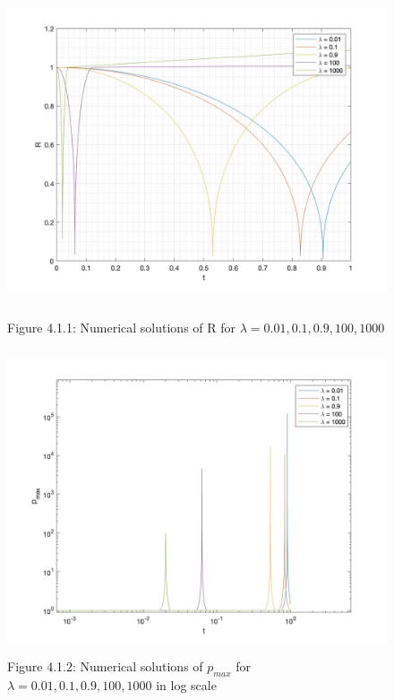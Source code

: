 \documentclass[11pt]{article}
\begin{document}
\begin{figure}[H]
\includegraphics[width = 12cm, height = 9cm]{Q4(1).jpg}
\caption{Figure 4.1.1: Numerical solutions of R for $\lambda = 0.01, 0.1, 0.9, 100, 1000$}
\includegraphics[width = 12cm, height = 9cm]{Q4(2).jpg}
\caption{Figure 4.1.2: Numerical solutions of $p_{max}$ for $\lambda = 0.01, 0.1, 0.9, 100, 1000$ in log scale}
\end{figure}
\end{document}
